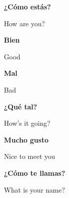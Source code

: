 \documentclass[avery5388,grid]{flashcards}
\begin{document}
\begin{flashcard}[Vocabulary]{\textbf{¿Cómo estás?}}
    \begin{center}
        How are you?
    \end{center}
\end{flashcard}

\begin{flashcard}[Vocabulary]{\textbf{Bien}}
    \begin{center}
        Good
    \end{center}
\end{flashcard}

\begin{flashcard}[Vocabulary]{\textbf{Mal}}
    \begin{center}
        Bad
    \end{center}
\end{flashcard}

\begin{flashcard}[Vocabulary]{\textbf{¿Qué tal?}}
    \begin{center}
        How's it going?
    \end{center}
\end{flashcard}

\begin{flashcard}[Vocabulary]{\textbf{Mucho gusto}}
    \begin{center}
        Nice to meet you
    \end{center}
\end{flashcard}

\begin{flashcard}[Vocabulary]{\textbf{¿Cómo te llamas?}}
    \begin{center}
        What is your name?
    \end{center}
\end{flashcard}
\end{document}

